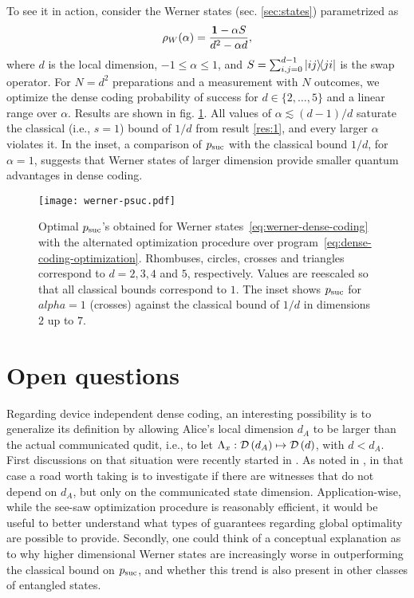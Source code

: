         To see it in action, consider the Werner states (sec. \ref{sec:states}) parametrized as
        \begin{equation}
            \rho_W ( \alpha ) = \frac{\mathbf{1} - \alpha S}{d^2 - \alpha d} ,
            \label{eq:werner-dense-coding}
        \end{equation}
        where $d$ is the local dimension, $-1 \leq \alpha \leq 1$, and $S = \sum_{i,j=0}^{d-1} \ketbra{ij}{ji}$ is the swap operator. For $N = d^2$ preparations and a measurement with $N$ outcomes, we optimize the dense coding probability of success for $d \in \{2, \ldots, 5\}$ and a linear range over $\alpha$. Results are shown in fig. \ref{fig:werner-dense-coding-psuc}. All values of $\alpha \lesssim (d-1)/d$ saturate the classical (i.e., $s=1$) bound of $1/d$ from result \ref{res:1}, and every larger $\alpha$ violates it. In the inset, a comparison of $p_{\text{suc}}$ with the classical bound $1/d$, for $\alpha = 1$, suggests that Werner states of larger dimension provide smaller quantum advantages in dense coding.
        
        \begin{figure}
            \centering
            \texttt{[image: werner-psuc.pdf]}
            \caption{Optimal $p_{\text{suc}}$'s obtained for Werner states~\eqref{eq:werner-dense-coding} with the alternated optimization procedure over program~\eqref{eq:dense-coding-optimization}. Rhombuses, circles, crosses and triangles correspond to $d = 2, 3, 4$ and $5$, respectively. Values are reescaled so that all classical bounds correspond to $1$. The inset shows $p_{\text{suc}}$ for $alpha = 1$ (crosses) against the classical bound of $1/d$ in dimensions $2$ up to $7$.}
        \label{fig:werner-dense-coding-psuc}
        \end{figure}

    
    \section{Open questions}

    Regarding device independent dense coding, an interesting possibility is to generalize its definition by allowing Alice's local dimension $d_A$ to be larger than the actual communicated qudit, i.e., to let $\Lambda_x : \mathcal{D}\left( d_A \right) \mapsto \mathcal{D}\left( d \right)$, with $d < d_A$. First discussions on that situation were recently started in \cite{nayak_rigidity_2020,tavakoli_eapam_2021}. As noted in \cite{tavakoli_eapam_2021}, in that case a road worth taking is to investigate if there are witnesses that do not depend on $d_A$, but only on the communicated state dimension. Application-wise, while the see-saw optimization procedure is reasonably efficient, it would be useful to better understand what types of guarantees regarding global optimality are possible to provide. Secondly, one could think of a conceptual explanation as to why higher dimensional Werner states are increasingly worse in outperforming the classical bound on $p_{\text{suc}}$, and whether this trend is also present in other classes of entangled states.

